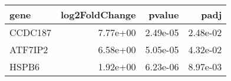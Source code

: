 \begin{tabular}{lrrr}
\toprule
   gene &  log2FoldChange &   pvalue &     padj \\
\midrule
CCDC187 &        7.77e+00 & 2.49e-05 & 2.48e-02 \\
ATF7IP2 &        6.58e+00 & 5.05e-05 & 4.32e-02 \\
  HSPB6 &        1.92e+00 & 6.23e-06 & 8.97e-03 \\
\bottomrule
\end{tabular}
